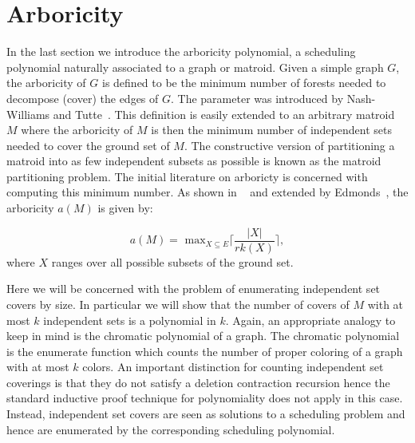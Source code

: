 \documentclass[12pt,reqno]{amsart}
\numberwithin{definition}{section}
\theoremstyle{definition}
\begin{document}
\section{Arboricity}
\label{arboricty}


In the last section we introduce the arboricity polynomial, a
scheduling polynomial naturally associated to a graph or matroid.
Given a simple graph $G$, the arboricity of $G$ is defined to be the
minimum number of forests needed to decompose (cover) the edges of
$G$.  The parameter was introduced by Nash-Williams and Tutte~\cite{Nash, Tutte}.
This definition is easily extended to an arbitrary matroid $M$ where the
arboricity of $M$ is then the minimum number of independent sets needed to
cover the ground set of $M$.  The constructive version of partitioning
a matroid into as few independent subsets as possible is known as the
matroid partitioning problem. The initial
literature on arboricty is concerned with computing this minimum number.  As shown in 
~\cite{Nash, Tutte} and extended by Edmonds~\cite{Edmonds}, the arboricity $a(M)$ is given
by:

$$ a(M) = \textrm{ max}_{X\subseteq E} \lceil { \frac{|X|}{rk(X)}} \rceil, $$
where $X$ ranges over all possible subsets of the ground set.

Here we will be concerned with the problem of enumerating independent
set covers by size.  In particular we will show that the number of
covers of $M$ with at most $k$ independent sets is a polynomial in
$k$.  Again, an appropriate analogy to keep in mind is the chromatic
polynomial of a graph.  The chromatic polynomial is the enumerate
function which counts the number of proper coloring of a graph with at
most $k$ colors.  
 An important distinction for counting independent set coverings is
 that they do not satisfy a deletion contraction recursion hence the
 standard inductive proof technique for polynomiality does not apply in
 this case.  Instead, independent set covers are seen as solutions to
 a scheduling problem and hence are enumerated by the corresponding
 scheduling polynomial.
\end{document}
